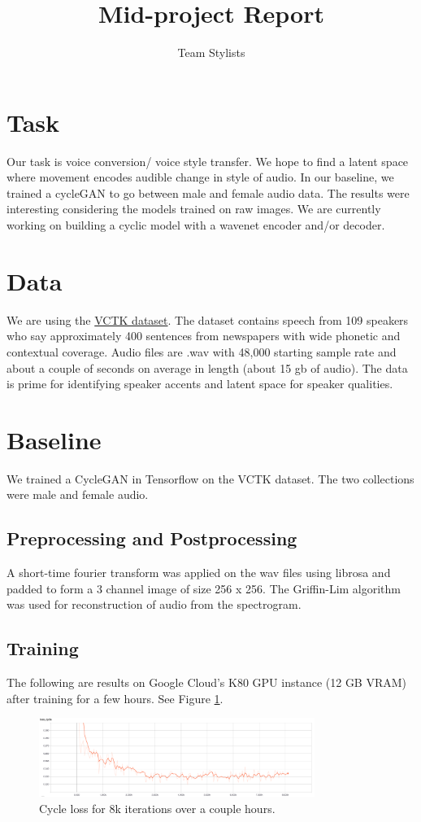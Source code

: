 \documentclass[a4paper]{article}
\title{Mid-project Report}
\author{Team Stylists}
\begin{document}
\maketitle

\section{Task}
Our task is voice conversion/ voice style transfer. We hope to find a latent space where movement encodes audible change in style of audio. In our baseline, we trained a cycleGAN to go between male and female audio data. The results were interesting considering the models trained on raw images. We are currently working on building a cyclic model with a wavenet encoder and/or decoder.

\section{Data}
We are using the \href{http://homepages.inf.ed.ac.uk/jyamagis/page3/page58/page58.html}{VCTK dataset}. The dataset contains speech from 109 speakers who say approximately 400 sentences from newspapers with wide phonetic and contextual coverage. Audio files are .wav with 48,000 starting sample rate and about a couple of seconds on average in length (about 15 gb of audio). The data is prime for identifying speaker accents and latent space for speaker qualities.

\section{Baseline}
We trained a CycleGAN in Tensorflow on the VCTK dataset. The two collections were male and female audio.
\subsection{Preprocessing and Postprocessing}
A short-time fourier transform was applied on the wav files using librosa and padded to form a 3 channel image of size 256 x 256. The Griffin-Lim algorithm was used for reconstruction of audio from the spectrogram.

\subsection{Training}
The following are results on Google Cloud's K80 GPU instance (12 GB VRAM) after training for a few hours. See Figure \ref{fig:cycleloss}.
\begin{figure}[!htb]
\centering
\includegraphics[width=0.8\textwidth]{cyclegan_cycleloss.png}
\caption{\label{fig:cycleloss}Cycle loss for 8k iterations over a couple hours.}
\end{figure}
\end{document}
